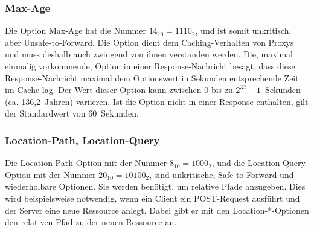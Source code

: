 \subsubsection{Max-Age}
\label{option:maxage}
Die Option Max-Age hat die Nummer $14_{10}=1110_{2}$, und ist somit unkritisch,
aber Unsafe-to-Forward. Die Option dient dem Caching-Verhalten von Proxys und
muss deshalb auch zwingend von ihnen verstanden werden. Die, maximal einmalig
vorkommende, Option in einer Response-Nachricht besagt, dass diese Response-Nachricht
maximal dem Optionswert in Sekunden entsprechende Zeit im Cache lag.
Der Wert dieser Option kann zwischen 0 bis zu $2^{32} - 1$~Sekunden (ca.
136,2~Jahren) variieren.
Ist die Option nicht in einer Response enthalten, gilt der Standardwert von 60~Sekunden.
\subsubsection{Location-Path, Location-Query}
\label{option:locationoptions}
Die Location-Path-Option mit der Nummer $8_{10}=1000_{2}$, und die
Location-Query-Option mit der Nummer $20_{10}=10100_{2}$, sind unkritische,
Safe-to-Forward und wiederholbare Optionen. Sie werden benötigt, um relative
Pfade anzugeben. Dies wird beispielsweise notwendig, wenn ein Client ein
POST-Request ausführt und der Server eine neue Ressource anlegt. Dabei gibt er
mit den Location-*-Optionen den relativen Pfad zu der neuen Ressource an.

